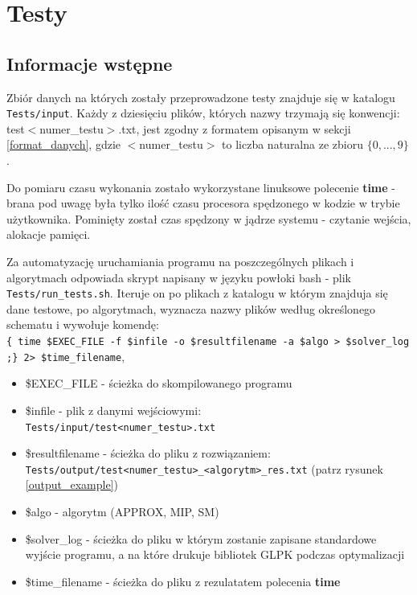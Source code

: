 \chapter{Testy}  \label{ch:CHAPTER_3}
\thispagestyle{chapterBeginStyle}


\section{Informacje wstępne}
Zbiór danych na których zostały przeprowadzone testy znajduje się w katalogu \verb|Tests/input|. Każdy z dziesięciu plików, których nazwy trzymają się konwencji: test$<$numer\_testu$>$.txt, jest zgodny z formatem opisanym w sekcji \ref{format_danych}, gdzie $<$numer\_testu$>$ to liczba naturalna ze zbioru $\{0, ..., 9\}$.

Do pomiaru czasu wykonania zostało wykorzystane linuksowe polecenie \textbf{time} - brana pod uwagę była tylko ilość czasu procesora spędzonego w kodzie w trybie użytkownika. Pominięty został czas spędzony w jądrze systemu - czytanie wejścia, alokacje pamięci.

Za automatyzację uruchamiania programu na poszczególnych plikach i algorytmach odpowiada skrypt napisany w języku powłoki bash - plik \verb|Tests/run_tests.sh|. Iteruje on po plikach z katalogu w którym znajduja się dane testowe, po algorytmach, wyznacza nazwy plików według określonego schematu i wywołuje komendę: \\
\verb|{ time $EXEC_FILE -f $infile -o $resultfilename -a $algo > $solver_log ;} 2> $time_filename|, 

\begin{itemize}
	\item \$EXEC\_FILE - ścieżka do skompilowanego programu
	\item \$infile - plik z danymi wejściowymi: \\
	\verb|Tests/input/test<numer_testu>.txt|
	\item \$resultfilename - ścieżka do pliku z rozwiązaniem: \\ \verb|Tests/output/test<numer_testu>_<algorytm>_res.txt| (patrz rysunek \ref{output_example})
	\item \$algo - algorytm (APPROX, MIP, SM)
	\item \$solver\_log - ścieżka do pliku w którym zostanie zapisane standardowe wyjście programu, a na które drukuje bibliotek GLPK podczas optymalizacji
	\item \$time\_filename - ścieżka do pliku z rezulatatem polecenia \textbf{time}
\end{itemize}

